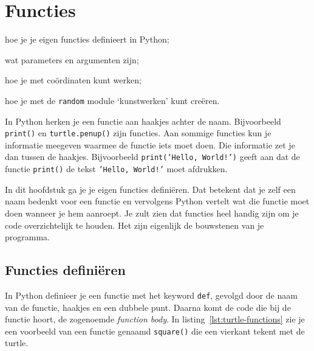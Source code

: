 \documentclass[../main]{subfiles}
\begin{document}
\graphicspath{{images/}}
\renewcommand\lTblrDefaultHruleColorTl{chap_color}

\pagestyle{mypagestyle}

\chapter{Functies}%
\label{chap:functies}
\begin{objectivesbox}
    \begin{objectiveslist}
        \item hoe je je eigen functies definieert in Python;
        \item wat parameters en argumenten zijn;
        \item hoe je met coördinaten kunt werken;
        \item hoe je met de \texttt{random} module `kunstwerken' kunt creëren.
    \end{objectiveslist}
\end{objectivesbox}

In Python herken je een functie aan haakjes achter de naam. Bijvoorbeeld \texttt{print()} en \texttt{turtle.penup()} zijn functies. Aan sommige functies kun je informatie meegeven waarmee de functie iets moet doen. Die informatie zet je dan tussen de haakjes. Bijvoorbeeld \texttt{print('Hello, World!')} geeft aan dat de functie \texttt{print()} de tekst \texttt{'Hello, World!'} moet afdrukken.

In dit hoofdstuk ga je je eigen functies definiëren. Dat betekent dat je zelf een naam bedenkt voor een functie en vervolgens Python vertelt wat die functie moet doen wanneer je hem aanroept. Je zult zien dat functies heel handig zijn om je code overzichtelijk te houden. Het zijn eigenlijk de bouwstenen van je programma.

\section{Functies definiëren}%
\label{sec:functies-definieren}
In Python definieer je een functie met het keyword \texttt{def}, gevolgd door de naam van de functie, haakjes en een dubbele punt. Daarna komt de code die bij de functie hoort, de zogenoemde \emph{function body}. In listing~\ref{lst:turtle-functions} zie je een voorbeeld van een functie genaamd \texttt{square()} die een vierkant tekent met de turtle.
\end{document}
